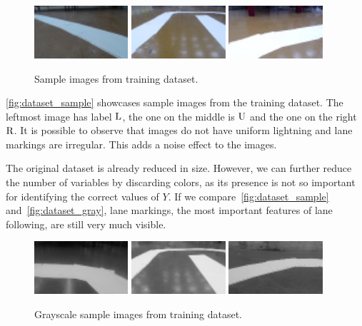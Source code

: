 \begin{figure}[h]
  \centering\includegraphics[width=0.31\textwidth]{imgs/sample_left.png}
  \includegraphics[width=0.31\textwidth]{imgs/sample_up.png}
  \includegraphics[width=0.31\textwidth]{imgs/sample_right.png}
  \caption{Sample images from training dataset.\label{fig:dataset_sample}}
\end{figure}

\autoref{fig:dataset_sample} showcases sample images from the training dataset. The leftmost image
has label $\text{L}$, the one on the middle is $\text{U}$ and the one on the right $\text{R}$. It is possible
to observe that images do not have uniform lightning and lane markings are irregular. This adds a
noise effect to the images.

The original dataset is already reduced in size. However, we can further reduce the number of
variables by discarding colors, as its presence is not so important for identifying the correct
values of $Y$. If we compare~\autoref{fig:dataset_sample} and~\autoref{fig:dataset_gray}, lane
markings, the most important features of lane following, are still very much visible.

\begin{figure}[h]
  \centering\includegraphics[width=0.31\textwidth]{imgs/gray_left.png}
  \includegraphics[width=0.31\textwidth]{imgs/gray_up.png}
  \includegraphics[width=0.31\textwidth]{imgs/gray_right.png}
  \caption{Grayscale sample images from training dataset.\label{fig:dataset_gray}}
\end{figure}


